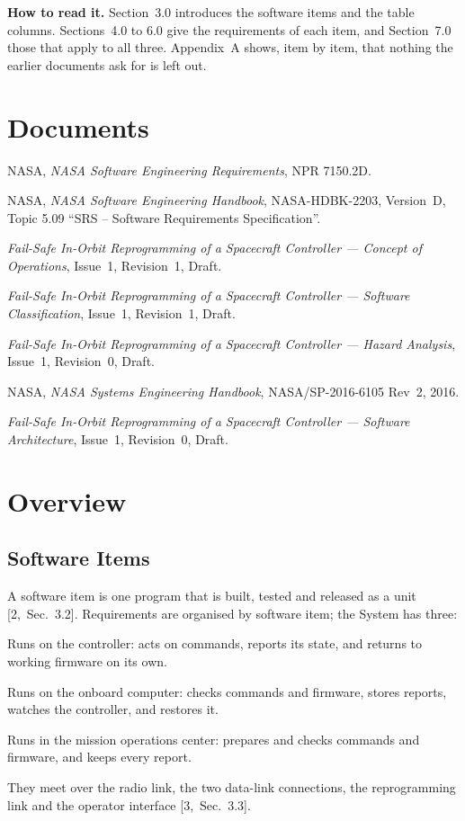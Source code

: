 \documentclass[11pt,a4paper]{article}
\begin{document}
\noindent\textbf{How to read it.} Section~3.0 introduces the software items
and the table columns. Sections~4.0 to 6.0 give the requirements of each item,
and Section~7.0 those that apply to all three. Appendix~A shows, item by item,
that nothing the earlier documents ask for is left out.

\section{Documents}
\noindent [1] NASA, \emph{NASA Software Engineering Requirements}, NPR 7150.2D.

\noindent [2] NASA, \emph{NASA Software Engineering Handbook}, NASA-HDBK-2203,
Version~D, Topic 5.09 ``SRS -- Software Requirements Specification''.

\noindent [3] \emph{Fail-Safe In-Orbit Reprogramming of a Spacecraft
Controller --- Concept of Operations}, Issue~1, Revision~1, Draft.

\noindent [4] \emph{Fail-Safe In-Orbit Reprogramming of a Spacecraft
Controller --- Software Classification}, Issue~1, Revision~1, Draft.

\noindent [5] \emph{Fail-Safe In-Orbit Reprogramming of a Spacecraft
Controller --- Hazard Analysis}, Issue~1, Revision~0, Draft.

\noindent [6] NASA, \emph{NASA Systems Engineering Handbook},
NASA/SP-2016-6105 Rev~2, 2016.

\noindent [7] \emph{Fail-Safe In-Orbit Reprogramming of a Spacecraft
Controller --- Software Architecture}, Issue~1, Revision~0, Draft.

\section{Overview}

\subsection{Software Items}
A software item is one program that is built, tested and released as a unit
[2,~Sec.~3.2]. Requirements are organised by software item; the System has
three:
\begin{description}[leftmargin=4.8cm]
\item[Controller firmware] Runs on the controller: acts on commands, reports
  its state, and returns to working firmware on its own.
\item[Onboard computer software] Runs on the onboard computer: checks commands
  and firmware, stores reports, watches the controller, and restores it.
\item[Ground software] Runs in the mission operations center: prepares and
  checks commands and firmware, and keeps every report.
\end{description}
They meet over the radio link, the two data-link connections, the
reprogramming link and the operator interface [3,~Sec.~3.3].
\end{document}
